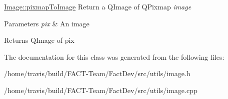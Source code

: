 \hyperlink{classUtils_1_1Image_a46e214e9d7fabf71ecd7ff9c041c198a}{Image\-::pixmap\-To\-Image} Return a Q\-Image of Q\-Pixmap {\itshape image} 


\begin{DoxyParams}{Parameters}
{\em pix} & An image \\
\hline
\end{DoxyParams}
\begin{DoxyReturn}{Returns}
Q\-Image of pix 
\end{DoxyReturn}


The documentation for this class was generated from the following files\-:\begin{DoxyCompactItemize}
\item 
/home/travis/build/\-F\-A\-C\-T-\/\-Team/\-Fact\-Dev/src/utils/image.\-h\item 
/home/travis/build/\-F\-A\-C\-T-\/\-Team/\-Fact\-Dev/src/utils/image.\-cpp\end{DoxyCompactItemize}
